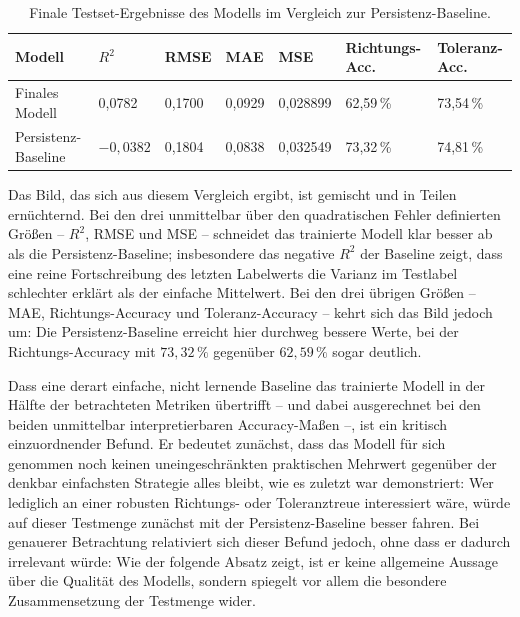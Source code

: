 \begin{table}[h]
    \centering
    \small
    \caption[Finale Testset-Ergebnisse]{Finale Testset-Ergebnisse des Modells im Vergleich zur Persistenz-Baseline.}
    \label{tab:test_ergebnisse}
    \begin{tabularx}{\textwidth}{@{} l X X X X X X @{}}
        \toprule
        \textbf{Modell} & \textbf{$R^2$} & \textbf{RMSE} & \textbf{MAE} & \textbf{MSE} & \textbf{Richtungs-Acc.} & \textbf{Toleranz-Acc.} \\
        \midrule
        Finales Modell       & 0{,}0782 & 0{,}1700 & 0{,}0929 & 0{,}028899 & 62{,}59\,\% & 73{,}54\,\% \\
        Persistenz-Baseline  & $-0{,}0382$ & 0{,}1804 & 0{,}0838 & 0{,}032549 & 73{,}32\,\% & 74{,}81\,\% \\
        \bottomrule
    \end{tabularx}
\end{table}

Das Bild, das sich aus diesem Vergleich ergibt, ist gemischt und in Teilen ernüchternd. Bei den drei unmittelbar über den quadratischen Fehler definierten Größen -- $R^2$, \gls{RMSE} und \gls{MSE} -- schneidet das trainierte Modell klar besser ab als die Persistenz-Baseline; insbesondere das negative $R^2$ der Baseline zeigt, dass eine reine Fortschreibung des letzten Labelwerts die Varianz im Testlabel schlechter erklärt als der einfache Mittelwert. Bei den drei übrigen Größen -- \gls{MAE}, Richtungs-Accuracy und Toleranz-Accuracy -- kehrt sich das Bild jedoch um: Die Persistenz-Baseline erreicht hier durchweg bessere Werte, bei der Richtungs-Accuracy mit $73{,}32\,\%$ gegenüber $62{,}59\,\%$ sogar deutlich.

Dass eine derart einfache, nicht lernende Baseline das trainierte Modell in der Hälfte der betrachteten Metriken übertrifft -- und dabei ausgerechnet bei den beiden unmittelbar interpretierbaren Accuracy-Maßen --, ist ein kritisch einzuordnender Befund. Er bedeutet zunächst, dass das Modell für sich genommen noch keinen uneingeschränkten praktischen Mehrwert gegenüber der denkbar einfachsten Strategie \glqq alles bleibt, wie es zuletzt war\grqq{} demonstriert: Wer lediglich an einer robusten Richtungs- oder Toleranztreue interessiert wäre, würde auf dieser Testmenge zunächst mit der Persistenz-Baseline besser fahren. Bei genauerer Betrachtung relativiert sich dieser Befund jedoch, ohne dass er dadurch irrelevant würde: Wie der folgende Absatz zeigt, ist er keine allgemeine Aussage über die Qualität des Modells, sondern spiegelt vor allem die besondere Zusammensetzung der Testmenge wider.

